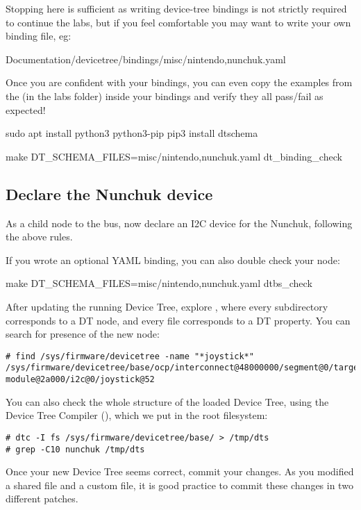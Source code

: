 Stopping here is sufficient as writing device-tree bindings is not
strictly required to continue the labs, but if you feel comfortable
you may want to write your own binding file, eg:
\begin{bashinput}
Documentation/devicetree/bindings/misc/nintendo,nunchuk.yaml
\end{bashinput}
Once you are confident with your bindings, you can even copy the
examples from the  (in the
 labs folder) inside your bindings and verify they all
pass/fail as expected!
\begin{bashinput}
sudo apt install python3 python3-pip
pip3 install dtschema

make DT_SCHEMA_FILES=misc/nintendo,nunchuk.yaml dt_binding_check
\end{bashinput}

\subsection{Declare the Nunchuk device}

As a child node to the  bus, now declare an I2C device
for the Nunchuk, following the above rules.

If you wrote an optional YAML binding, you can also double check your
node:
\begin{bashinput}
make DT_SCHEMA_FILES=misc/nintendo,nunchuk.yaml dtbs_check
\end{bashinput}

After updating the running Device Tree, explore
, where every subdirectory corresponds to
a DT node, and every file corresponds to a DT property. You can search
for presence of the new  node:

{\small
\begin{verbatim}
# find /sys/firmware/devicetree -name "*joystick*"
/sys/firmware/devicetree/base/ocp/interconnect@48000000/segment@0/target-module@2a000/i2c@0/joystick@52
\end{verbatim}
}

You can also check the whole structure of the loaded Device Tree, using
the Device Tree Compiler (), which we put in the root
filesystem:
\begin{verbatim}
# dtc -I fs /sys/firmware/devicetree/base/ > /tmp/dts
# grep -C10 nunchuk /tmp/dts
\end{verbatim}

Once your new Device Tree seems correct, commit your changes. As you
modified a shared file and a custom file, it is good practice to commit
these changes in two different patches.
